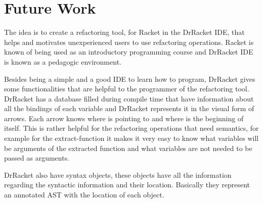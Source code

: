
% 
% 


\section{Future Work}





The idea is to create a refactoring tool, for Racket in the DrRacket IDE, that helps and motivates unexperienced users to use refactoring operations. Racket is known of being used as an introductory programming course and DrRacket IDE is known as a pedagogic environment.

Besides being a simple and a good IDE to learn how to program, DrRacket gives some functionalities that are helpful to the programmer of the refactoring tool. 
DrRacket has a database filled during compile time that have information about all the bindings of each variable and DrRacket represents it in the visual form of arrows. 
Each arrow knows where is pointing to and where is the beginning of itself. 
This is rather helpful for the refactoring operations that need semantics, for example for the extract-function it makes it very easy to know what variables will be arguments of the extracted function and what variables are not needed to be passed as arguments.

DrRacket also have syntax objects, these objects have all the information regarding the syntactic information and their location. Basically they represent an annotated AST with the location of each object.



